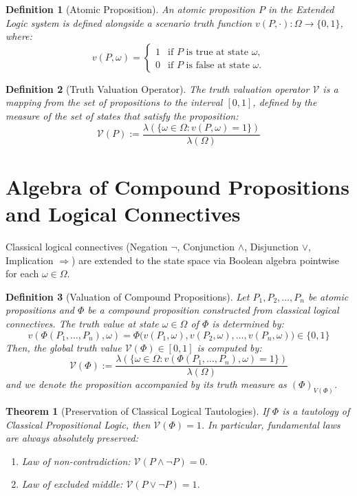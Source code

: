 \documentclass[a4paper,12pt, twoside]{memoir}
\newtheorem{definition}{Definition}[chapter]
\newtheorem{theorem}{Theorem}[chapter]
\newcommand{\ddclmd}{\mathcal{V}} %
\begin{document}
\begin{definition}[Atomic Proposition]
	An atomic proposition $P$ in the Extended Logic system is defined alongside a scenario truth function $v(P, \cdot) : \Omega \to \{0, 1\}$, where:
	\[
		v(P, \omega) = \begin{cases}
			1 & \text{if } P \text{ is true at state } \omega,  \\
			0 & \text{if } P \text{ is false at state } \omega.
		\end{cases}
	\]
\end{definition}

\begin{definition}[Truth Valuation Operator]
	The truth valuation operator $\ddclmd$ is a mapping from the set of propositions to the interval $[0, 1]$, defined by the measure of the set of states that satisfy the proposition:
	\[
		\ddclmd(P) := \frac{\lambda(\{\omega \in \Omega : v(P, \omega) = 1\})}{\lambda(\Omega)}
	\]
\end{definition}

\section{Algebra of Compound Propositions and Logical Connectives}
Classical logical connectives (Negation $\neg$, Conjunction $\land$, Disjunction $\lor$, Implication $\Rightarrow$) are extended to the state space via Boolean algebra pointwise for each $\omega \in \Omega$.

\begin{definition}[Valuation of Compound Propositions]
	Let $P_1, P_2, \dots, P_n$ be atomic propositions and $\Phi$ be a compound proposition constructed from classical logical connectives. The truth value at state $\omega \in \Omega$ of $\Phi$ is determined by:
	\[
		v(\Phi(P_1, \dots, P_n), \omega) = \Phi\big(v(P_1, \omega), v(P_2, \omega), \dots, v(P_n, \omega)\big) \in \{0, 1\}
	\]
	Then, the global truth value $\ddclmd(\Phi) \in [0, 1]$ is computed by:
	\[
		\ddclmd(\Phi) := \frac{\lambda(\{\omega \in \Omega : v(\Phi(P_1, \dots, P_n), \omega) = 1\})}{\lambda(\Omega)}
	\]
	and we denote the proposition accompanied by its truth measure as $(\Phi)_{V(\Phi)}$.
\end{definition}

\begin{theorem}[Preservation of Classical Logical Tautologies]
	If $\Phi$ is a tautology of Classical Propositional Logic, then $\ddclmd(\Phi) = 1$. In particular, fundamental laws are always absolutely preserved:
	\begin{enumerate}[leftmargin=*]
		\item Law of non-contradiction: $\ddclmd(P \land \neg P) = 0$.
		\item Law of excluded middle: $\ddclmd(P \lor \neg P) = 1$.
	\end{enumerate}
\end{theorem}
\end{document}
